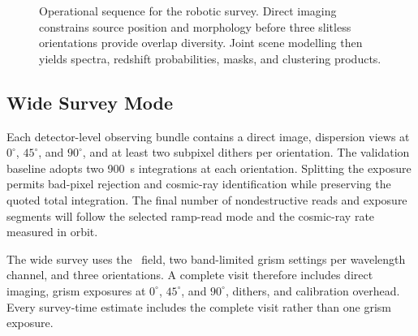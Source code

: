 \begin{figure}[htbp]
\centering
{}
\caption{Operational sequence for the robotic survey. Direct imaging constrains source position and morphology before three slitless orientations provide overlap diversity. Joint scene modelling then yields spectra, redshift probabilities, masks, and clustering products.}
\label{fig:ops}
\end{figure}

\subsection{Wide Survey Mode}

Each detector-level observing bundle contains a direct image, dispersion views at $0^\circ$, $45^\circ$, and $90^\circ$, and at least two subpixel dithers per orientation. The validation baseline adopts two 900~s integrations at each orientation. Splitting the exposure permits bad-pixel rejection and cosmic-ray identification while preserving the quoted total integration. The final number of nondestructive reads and exposure segments will follow the selected ramp-read mode and the cosmic-ray rate measured in orbit.

The wide survey uses the \fovlarge\ field, two band-limited grism settings per wavelength channel, and three orientations. A complete visit therefore includes direct imaging, grism exposures at $0^\circ$, $45^\circ$, and $90^\circ$, dithers, and calibration overhead. Every survey-time estimate includes the complete visit rather than one grism exposure.

